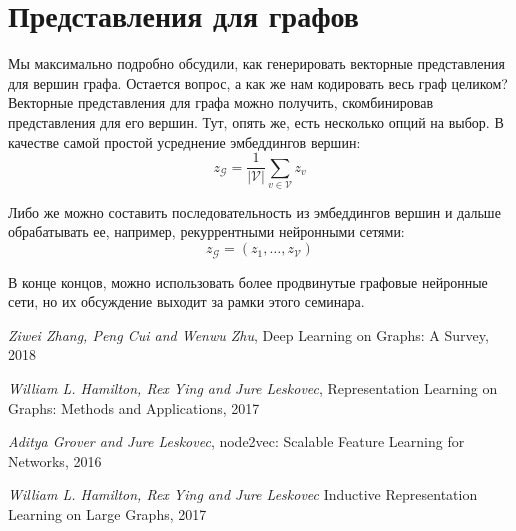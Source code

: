 \documentclass[12pt,a4paper]{article}
\begin{document}
\section{Представления для графов}

Мы максимально подробно обсудили, как генерировать векторные представления для вершин графа. Остается вопрос, а как же нам кодировать весь граф целиком? Векторные представления для графа можно получить, скомбинировав представления для его вершин. Тут, опять же, есть несколько опций на выбор. В качестве самой простой усреднение эмбеддингов вершин:
$$
z_{\mathcal{G}} = \frac{1}{|\mathcal{V}|} \sum_{v \in \mathcal{V}} z_v
$$

\noindent
Либо же можно составить последовательность из эмбеддингов вершин и дальше обрабатывать ее, например, рекуррентными нейронными сетями:
$$
z_{\mathcal{G}} = (z_1, \dots, z_{\mathcal{V}})
$$

\noindent
В конце концов, можно использовать более продвинутые графовые нейронные сети, но их обсуждение выходит за рамки этого семинара.

\begin{thebibliography}{}
    \emph{Ziwei Zhang, Peng Cui and Wenwu Zhu},
    Deep Learning on Graphs: A Survey, 2018

    \emph{William L. Hamilton, Rex Ying and Jure Leskovec},
    Representation Learning on Graphs: Methods and Applications, 2017

    \emph{Aditya Grover and Jure Leskovec},
    node2vec: Scalable Feature Learning for Networks, 2016

    \emph{William L. Hamilton, Rex Ying and Jure Leskovec}
    Inductive Representation Learning on Large Graphs, 2017
\end{thebibliography}
\end{document}
